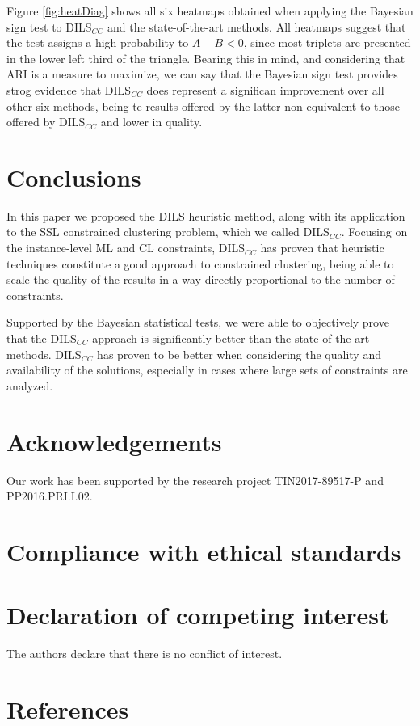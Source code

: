 \documentclass[review]{elsarticle}
\begin{document}
Figure \ref{fig:heatDiag} shows all six heatmaps obtained when applying the Bayesian sign test to DILS$_{CC}$ and the state-of-the-art methods. All heatmaps suggest that the test assigns a high probability to $A - B < 0$, since most triplets are presented in the lower left third of the triangle. Bearing this in mind, and considering that ARI is a measure to maximize, we can say that the Bayesian sign test provides strog evidence that DILS$_{CC}$ does represent a significan improvement over all other six methods, being te results offered by the latter non equivalent to those offered by DILS$_{CC}$ and lower in quality.

\clearpage

\section{Conclusions} \label{sec:conclusiones}

In this paper we proposed the DILS heuristic method, along with its application to the SSL constrained clustering problem, which we called DILS$_{CC}$. Focusing on the instance-level ML and CL constraints, DILS$_{CC}$ has proven that heuristic techniques constitute a good approach to constrained clustering, being able to scale the quality of the results in a way directly proportional to the number of constraints.
 
Supported by the Bayesian statistical tests, we were able to objectively prove that the DILS$_{CC}$ approach is significantly better than the state-of-the-art methods. DILS$_{CC}$ has proven to be better when considering the quality and availability of the solutions, especially in cases where large sets of constraints are analyzed.

\section*{Acknowledgements}

Our work has been supported by the research project TIN2017-89517-P and PP2016.PRI.I.02.

\section*{Compliance with ethical standards}

\section*{Declaration of competing interest}

The authors declare that there is no conflict of interest.

\clearpage

\section*{References}


\end{document}
